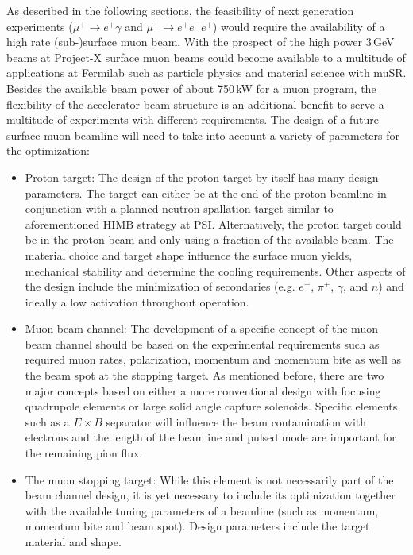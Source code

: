 As described in the following sections, the feasibility of next generation experiments ($\mu^+ \to e^+\gamma$ and $\mu^+ \to e^+e^-e^+$) would require the availability of a high rate (sub-)surface muon beam. With the prospect of the high power 3\,GeV beams at Project-X surface muon beams could become available to a multitude of applications at Fermilab such as particle physics and material science with muSR. Besides the available beam power of about 750\,kW for a muon program, the flexibility of the accelerator beam structure is an additional benefit to serve a multitude of experiments with different requirements. The design of a future surface muon beamline will need to take into account a variety of parameters for the optimization:
\begin{itemize}
\item Proton target: The design of the proton target by itself has many design parameters. The target can either be at the end of the proton beamline in conjunction with a planned neutron spallation target similar to aforementioned HIMB strategy at PSI. Alternatively, the proton target could be in the proton beam and only using a fraction of the available beam. The material choice and target shape influence the surface muon yields, mechanical stability and determine the cooling requirements. Other aspects of the design include the minimization of secondaries (e.g. $e^\pm$, $\pi^\pm$, $\gamma$, and $n$) and ideally a low activation throughout operation. 
\item Muon beam channel: The development of a specific concept of the muon beam channel should be based on the experimental requirements such as required muon rates, polarization, momentum and momentum bite as well as the beam spot at the stopping target. As mentioned before, there are two major concepts based on either a more conventional design with focusing quadrupole elements or large solid angle capture solenoids. Specific elements such as a $E\times B$ separator will influence the beam contamination with electrons and the length of the beamline and pulsed mode are important for the remaining pion flux.
\item The muon stopping target: While this element is not necessarily part of the beam channel design, it is yet necessary to include its optimization together with the available tuning parameters of a beamline (such as momentum, momentum bite and beam spot). Design parameters include the target material and shape. 
\end{itemize}

